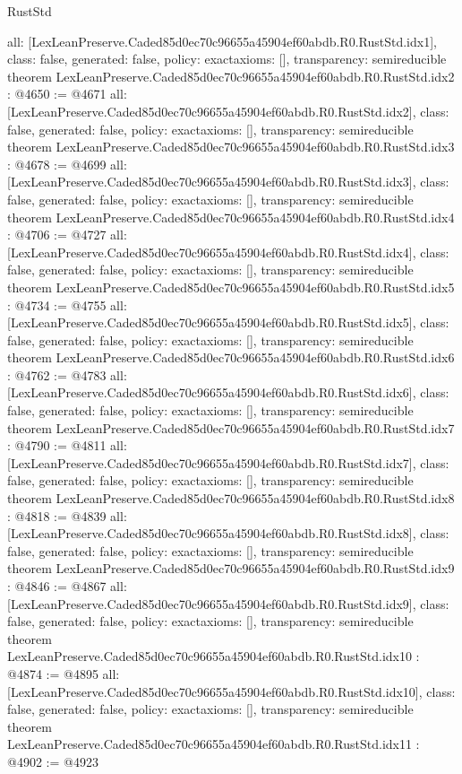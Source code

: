\begin{lexlean}{RustStd}
\begin{coremodule}
{  all: [LexLeanPreserve.Caded85d0ec70c96655a45904ef60abdb.R0.RustStd.idx1],
  class: false,
  generated: false,
  policy: exact{axioms: []},
  transparency: semireducible
}
theorem LexLeanPreserve.Caded85d0ec70c96655a45904ef60abdb.R0.RustStd.idx2 : @4650 := @4671 {
  all: [LexLeanPreserve.Caded85d0ec70c96655a45904ef60abdb.R0.RustStd.idx2],
  class: false,
  generated: false,
  policy: exact{axioms: []},
  transparency: semireducible
}
theorem LexLeanPreserve.Caded85d0ec70c96655a45904ef60abdb.R0.RustStd.idx3 : @4678 := @4699 {
  all: [LexLeanPreserve.Caded85d0ec70c96655a45904ef60abdb.R0.RustStd.idx3],
  class: false,
  generated: false,
  policy: exact{axioms: []},
  transparency: semireducible
}
theorem LexLeanPreserve.Caded85d0ec70c96655a45904ef60abdb.R0.RustStd.idx4 : @4706 := @4727 {
  all: [LexLeanPreserve.Caded85d0ec70c96655a45904ef60abdb.R0.RustStd.idx4],
  class: false,
  generated: false,
  policy: exact{axioms: []},
  transparency: semireducible
}
theorem LexLeanPreserve.Caded85d0ec70c96655a45904ef60abdb.R0.RustStd.idx5 : @4734 := @4755 {
  all: [LexLeanPreserve.Caded85d0ec70c96655a45904ef60abdb.R0.RustStd.idx5],
  class: false,
  generated: false,
  policy: exact{axioms: []},
  transparency: semireducible
}
theorem LexLeanPreserve.Caded85d0ec70c96655a45904ef60abdb.R0.RustStd.idx6 : @4762 := @4783 {
  all: [LexLeanPreserve.Caded85d0ec70c96655a45904ef60abdb.R0.RustStd.idx6],
  class: false,
  generated: false,
  policy: exact{axioms: []},
  transparency: semireducible
}
theorem LexLeanPreserve.Caded85d0ec70c96655a45904ef60abdb.R0.RustStd.idx7 : @4790 := @4811 {
  all: [LexLeanPreserve.Caded85d0ec70c96655a45904ef60abdb.R0.RustStd.idx7],
  class: false,
  generated: false,
  policy: exact{axioms: []},
  transparency: semireducible
}
theorem LexLeanPreserve.Caded85d0ec70c96655a45904ef60abdb.R0.RustStd.idx8 : @4818 := @4839 {
  all: [LexLeanPreserve.Caded85d0ec70c96655a45904ef60abdb.R0.RustStd.idx8],
  class: false,
  generated: false,
  policy: exact{axioms: []},
  transparency: semireducible
}
theorem LexLeanPreserve.Caded85d0ec70c96655a45904ef60abdb.R0.RustStd.idx9 : @4846 := @4867 {
  all: [LexLeanPreserve.Caded85d0ec70c96655a45904ef60abdb.R0.RustStd.idx9],
  class: false,
  generated: false,
  policy: exact{axioms: []},
  transparency: semireducible
}
theorem LexLeanPreserve.Caded85d0ec70c96655a45904ef60abdb.R0.RustStd.idx10 : @4874 := @4895 {
  all: [LexLeanPreserve.Caded85d0ec70c96655a45904ef60abdb.R0.RustStd.idx10],
  class: false,
  generated: false,
  policy: exact{axioms: []},
  transparency: semireducible
}
theorem LexLeanPreserve.Caded85d0ec70c96655a45904ef60abdb.R0.RustStd.idx11 : @4902 := @4923 {
}
\end{coremodule}
\end{lexlean}

